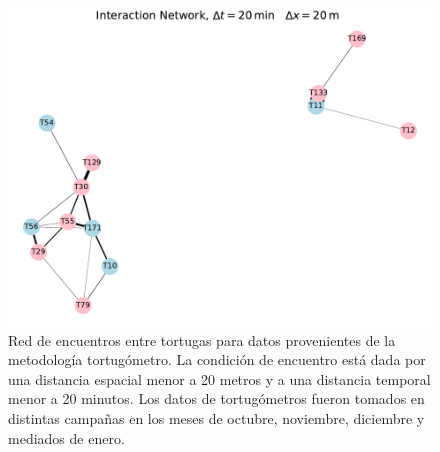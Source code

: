  
\begin{figure}[ht]
    \begin{center}
       
   
    \includegraphics[width=\imsize]{Chap2/red_interaccion_20min_campanas.pdf}
\end{center}
    \caption[Red de encuentros entre tortugas  con datos tomados por el tortugómetro.]{Red de encuentros entre tortugas para datos provenientes de la metodología  tortugómetro. La condición de encuentro está dada por una distancia espacial menor a 20 metros y a una distancia temporal menor a 20 minutos. Los datos de tortugómetros fueron tomados en distintas campañas en los meses de octubre, noviembre, diciembre y mediados de enero.}
    \label{fig:redInteraccion20mincampanas}
\end{figure}
 
 
 
